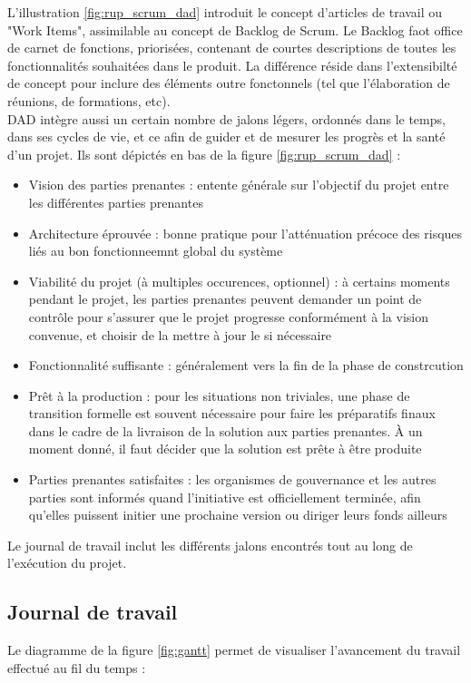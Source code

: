 \begin{spacing}{1.5}
L'illustration \ref{fig:rup_scrum_dad} introduit le concept d'articles de travail ou "Work Items", assimilable au concept de Backlog de Scrum. Le Backlog faot office de carnet de fonctions, priorisées, contenant de courtes descriptions de toutes les fonctionnalités souhaitées dans le produit. La différence réside dans l'extensibilté de concept pour inclure des éléments outre fonctonnels (tel que l'élaboration de réunions, de formations, etc).\\
DAD intègre aussi un certain nombre de jalons légers, ordonnés dans le temps, dans ses cycles de vie, et ce afin de guider et de mesurer les progrès et la santé d'un projet. Ils sont dépictés en bas de la figure \ref{fig:rup_scrum_dad} :
\begin{itemize}
    \item Vision des parties prenantes : entente générale sur l'objectif du projet entre les différentes parties prenantes
    \item Architecture éprouvée : bonne pratique pour l'atténuation précoce des risques liés au bon fonctionneemnt global du système
    \item Viabilité du projet (à multiples occurences, optionnel) :  à certains moments pendant le projet, les parties prenantes peuvent demander un point de contrôle pour s'assurer que le projet progresse conformément à la vision convenue, et choisir de la mettre à jour le si nécessaire
    \item Fonctionnalité suffisante : généralement vers la fin de la phase de constrcution
    \item Prêt à la production : pour les situations non triviales, une phase de transition formelle est souvent nécessaire pour faire les préparatifs finaux dans le cadre de la livraison de la solution aux parties prenantes. À un moment donné, il faut décider que la solution est prête à être produite
    \item Parties prenantes satisfaites : les organismes de gouvernance et les autres parties sont informés quand l'initiative est officiellement terminée, afin qu'elles puissent initier une prochaine version ou diriger leurs fonds ailleurs
\end{itemize}
Le journal de travail inclut les différents jalons encontrés tout au long de l'exécution du projet.

\subsection{Journal de travail}
Le diagramme de la figure \ref{fig:gantt} permet de visualiser l'avancement du travail effectué au fil du temps :


\end{spacing}
